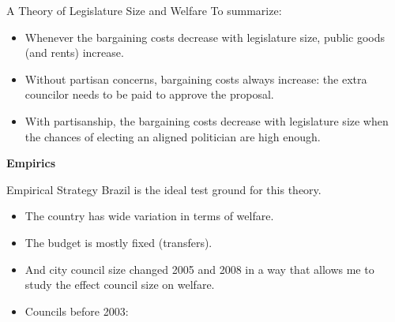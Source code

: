 \documentclass[11pt]{beamer}
\begin{document}
\begin{frame}{A Theory of Legislature Size and Welfare}
To summarize:

\vspace{0.15in}

\begin{itemize} \itemsep1em
    \item Whenever the bargaining costs decrease with legislature size, public goods (and rents) increase.
    \item Without partisan concerns, bargaining costs always increase: the extra councilor needs to be paid to approve the proposal.
    \item With partisanship, the bargaining costs decrease with legislature size when the chances of electing an aligned politician are high enough.
\end{itemize}
\end{frame}


\begin{frame}
\begin{center}
\Large{\textbf{Empirics}}
\end{center}
\end{frame}

\begin{frame}{Empirical Strategy}
Brazil is the ideal test ground for this theory.
  \begin{itemize} \itemsep1em
  \item The country has wide variation in terms of welfare.
  \item The budget is mostly fixed (transfers).
  \item And city council size changed 2005 and 2008 in a way that allows me to study the effect council size on welfare.
  \item Councils before 2003:
  \end{itemize}
  \begin{table}[htp!]
\centering
{}
\caption{City council size thresholds 1988 Constitution}
\label{tab_city_council_size_1988}
\end{table}
\end{frame}
\end{document}
